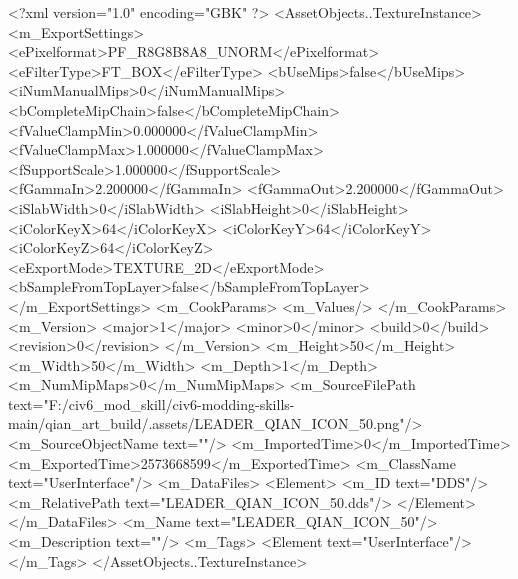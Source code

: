 <?xml version="1.0" encoding="GBK" ?>
<AssetObjects..TextureInstance>
	<m_ExportSettings>
		<ePixelformat>PF_R8G8B8A8_UNORM</ePixelformat>
		<eFilterType>FT_BOX</eFilterType>
		<bUseMips>false</bUseMips>
		<iNumManualMips>0</iNumManualMips>
		<bCompleteMipChain>false</bCompleteMipChain>
		<fValueClampMin>0.000000</fValueClampMin>
		<fValueClampMax>1.000000</fValueClampMax>
		<fSupportScale>1.000000</fSupportScale>
		<fGammaIn>2.200000</fGammaIn>
		<fGammaOut>2.200000</fGammaOut>
		<iSlabWidth>0</iSlabWidth>
		<iSlabHeight>0</iSlabHeight>
		<iColorKeyX>64</iColorKeyX>
		<iColorKeyY>64</iColorKeyY>
		<iColorKeyZ>64</iColorKeyZ>
		<eExportMode>TEXTURE_2D</eExportMode>
		<bSampleFromTopLayer>false</bSampleFromTopLayer>
	</m_ExportSettings>
	<m_CookParams>
		<m_Values/>
	</m_CookParams>
	<m_Version>
		<major>1</major>
		<minor>0</minor>
		<build>0</build>
		<revision>0</revision>
	</m_Version>
	<m_Height>50</m_Height>
	<m_Width>50</m_Width>
	<m_Depth>1</m_Depth>
	<m_NumMipMaps>0</m_NumMipMaps>
	<m_SourceFilePath text="F:/civ6_mod_skill/civ6-modding-skills-main/qian_art_build/.assets/LEADER_QIAN_ICON_50.png"/>
	<m_SourceObjectName text=""/>
	<m_ImportedTime>0</m_ImportedTime>
	<m_ExportedTime>2573668599</m_ExportedTime>
	<m_ClassName text="UserInterface"/>
	<m_DataFiles>
		<Element>
			<m_ID text="DDS"/>
			<m_RelativePath text="LEADER_QIAN_ICON_50.dds"/>
		</Element>
	</m_DataFiles>
	<m_Name text="LEADER_QIAN_ICON_50"/>
	<m_Description text=""/>
	<m_Tags>
		<Element text="UserInterface"/>
	</m_Tags>
</AssetObjects..TextureInstance>
